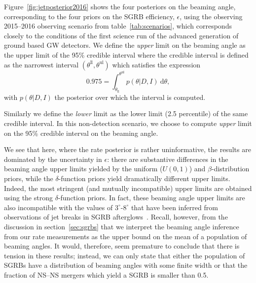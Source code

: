 \documentclass[twocolumn,nofootinbib]{revtex4-1}
\newcommand{\diff}{{\mathrm d}}
\newcommand{\BNS}{\ac{NS}--\ac{NS}\xspace}
\begin{document}

Figure~\ref{fig:jetposterior2016} shows the four posteriors on the
beaming angle, corresponding to the four priors on the \ac{SGRB}
efficiency, $\epsilon$, using the observing 2015--2016 observing
scenario from table~\ref{tab:scenarios}, which corresponds closely
to the conditions of the first science run of the advanced generation
of ground based \ac{GW} detectors.  We define the \emph{upper} limit
on the beaming angle as the upper limit of the 95\% credible interval
where the credible interval is defined as the narrowest interval
$(\theta^{\mathrm{ll}}, \theta^{\mathrm{ul}})$ which satisfies the expression
\begin{equation}
    \label{eq:beaming_upper_limit}
    0.975 = \int_{\theta_{\mathrm{ll}}}^{\theta^{\mathrm{ul}}} p(\theta|D,I)~\diff \theta,
\end{equation}
with $p(\theta|D,I)$ the posterior over which the interval is
computed.

Similarly we define the \emph{lower} limit as the lower
limit (2.5 percentile) of the same credible interval.  In this
non-detection scenario, we choose to compute \emph{upper} limit on the
95\% credible interval on the beaming angle.

We see that here, where the rate posterior is rather uninformative,
the results are dominated by the uncertainty in $\epsilon$: there are
substantive differences in the beaming angle upper limits yielded by
the uniform ($U(0,1)$) and $\beta$-distribution priors, while the
$\delta$-function priors yield dramatically different upper limits.
Indeed, the most stringent (and mutually incompatible) upper limits
are obtained using the strong $\delta$-function priors.  In fact,
these beaming angle upper limits are also incompatible with the values
of $3^{\circ}\mbox{-}8^{\circ}$ that have been inferred from
observations of jet breaks in \ac{SGRB}
afterglows~\cite{Fong:2013lba,2006MNRAS.367L..42P,
  2012A&A...538L...7N}.  Recall, however, from the discussion in
section~\ref{sec:sgrbs} that we interpret the beaming angle inference
from our rate measurements as the upper bound on the mean of a
population of beaming angles.  It would, therefore, seem premature to
conclude that there is tension in these results; instead, we can only
state that either the population of \acp{SGRB} have a distribution of
beaming angles with some finite width or that the fraction of \BNS
mergers which yield a \ac{SGRB} is smaller than 0.5.
\end{document}
